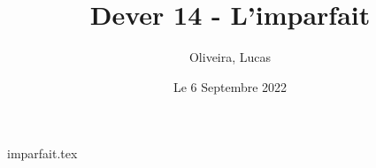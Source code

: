 \documentclass{article}
\title{Dever 14 - L'imparfait}
\author{Oliveira, Lucas}
\date{Le 6 Septembre 2022}
\begin{document}
    \maketitle
    \tableofcontents

    \newpage
    {imparfait.tex}
\end{document}
